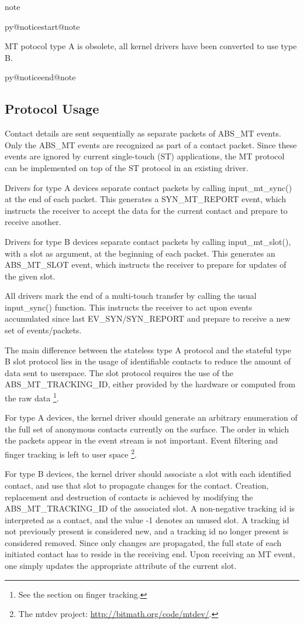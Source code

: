 \documentclass[a4paper,8pt,english]{sphinxmanual}
\makeatletter
\renewenvironment{notice}[2]{%
          \def\py@noticetype{#1}
          \begin{coloredbox}{#1}
          \bf\it
          \par\strong{#2}
          \csname py@noticestart@#1\endcsname
        }
	{
          \csname py@noticeend@\py@noticetype\endcsname
          \end{coloredbox}
        }
\makeatother
\begin{document}
\begin{notice}{note}{Note:}
MT potocol type A is obsolete, all kernel drivers have been
converted to use type B.
\end{notice}


\subsection{Protocol Usage}
\label{input/multi-touch-protocol:protocol-usage}
Contact details are sent sequentially as separate packets of ABS\_MT
events. Only the ABS\_MT events are recognized as part of a contact
packet. Since these events are ignored by current single-touch (ST)
applications, the MT protocol can be implemented on top of the ST protocol
in an existing driver.

Drivers for type A devices separate contact packets by calling
input\_mt\_sync() at the end of each packet. This generates a SYN\_MT\_REPORT
event, which instructs the receiver to accept the data for the current
contact and prepare to receive another.

Drivers for type B devices separate contact packets by calling
input\_mt\_slot(), with a slot as argument, at the beginning of each packet.
This generates an ABS\_MT\_SLOT event, which instructs the receiver to
prepare for updates of the given slot.

All drivers mark the end of a multi-touch transfer by calling the usual
input\_sync() function. This instructs the receiver to act upon events
accumulated since last EV\_SYN/SYN\_REPORT and prepare to receive a new set
of events/packets.

The main difference between the stateless type A protocol and the stateful
type B slot protocol lies in the usage of identifiable contacts to reduce
the amount of data sent to userspace. The slot protocol requires the use of
the ABS\_MT\_TRACKING\_ID, either provided by the hardware or computed from
the raw data \footnote[5]{
See the section on finger tracking.
}.

For type A devices, the kernel driver should generate an arbitrary
enumeration of the full set of anonymous contacts currently on the
surface. The order in which the packets appear in the event stream is not
important.  Event filtering and finger tracking is left to user space \footnote[3]{
The mtdev project: \href{http://bitmath.org/code/mtdev/}{http://bitmath.org/code/mtdev/}.
}.

For type B devices, the kernel driver should associate a slot with each
identified contact, and use that slot to propagate changes for the contact.
Creation, replacement and destruction of contacts is achieved by modifying
the ABS\_MT\_TRACKING\_ID of the associated slot.  A non-negative tracking id
is interpreted as a contact, and the value -1 denotes an unused slot.  A
tracking id not previously present is considered new, and a tracking id no
longer present is considered removed.  Since only changes are propagated,
the full state of each initiated contact has to reside in the receiving
end.  Upon receiving an MT event, one simply updates the appropriate
attribute of the current slot.
\end{document}
